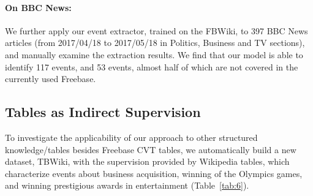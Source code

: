 
\paragraph{On BBC News:}
We further apply our event extractor, trained on the FBWiki, to 397 BBC News 
articles (from 2017/04/18 to 2017/05/18 in Politics, Business and TV sections), and manually examine the extraction results. We find that our model is able to identify 117 events, and 53 events, 
almost half of which are not covered in the currently used Freebase. 



\subsection{Tables as Indirect Supervision}
To investigate the applicability of our approach to other structured knowledge/tables besides Freebase CVT tables, %
we automatically build a new dataset, TBWiki, with the supervision provided by Wikipedia tables, which characterize events about business acquisition, winning of the Olympics games, and winning prestigious awards in entertainment (Table~\ref{tab:6}). 

